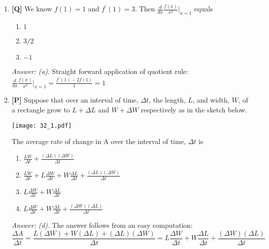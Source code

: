 \documentclass[12pt]{article}
\begin{document}
\begin{enumerate}
\bigskip

\item {\bf [Q]} We know $f(1)=1$ and $f^{\prime}(1)=3$. Then $\frac{d}{dx}\frac{f(x)}{x^2}|_{x=1}$ equals
\begin{enumerate}
\item $1$
\item $3/2$
\item $-1$
\end{enumerate}

{\it Answer: (a).} Straight forward application of quotient rule: $\frac{d}{dx}\frac{f(x)}{x^2} |_{x=1}=\frac{f^{\prime}(1)-2f(1)}{1}=1$

\bigskip

\item {\bf [P]}
Suppose that over an interval of time, $\Delta t$,  the length, $L$,  
and width, $W$,  of a rectangle grow to $L+\Delta L$ and $W+\Delta W$ 
respectively as in the sketch below. 

\begin{center}
%
\texttt{[image: 32\_1.pdf]}
\end{center}

The average rate of change 
in A over the interval of time, $\Delta t$ is

\begin{enumerate}
\item $\displaystyle{\frac{LW}{\Delta t}+\frac{(\Delta L)(\Delta W )}{\Delta t}}$
\item $\displaystyle{\frac{LW}{\Delta t}+L\frac{\Delta W}{\Delta t}+ W\frac{\Delta L}{\Delta t}+ \frac{(\Delta L)(\Delta W)}{\Delta t}}$
\item $\displaystyle{L\frac{ \Delta W}{\Delta t}+W\frac{ \Delta L}{\Delta t}}$
\item $\displaystyle{L\frac{\Delta W}{\Delta t}+W\frac{\Delta L}{\Delta t}+\frac{(\Delta W)(\Delta L)}{\Delta t}}$
\end{enumerate}

{\it Answer: (d).} The answer follows from an easy computation:
$$\displaystyle{\frac{\Delta A}{\Delta t}=\frac{L(\Delta W)+W(\Delta L)+(\Delta L)(\Delta W )}{\Delta t}=L\frac{\Delta W}{\Delta t}+W\frac{\Delta L}{\Delta t}+\frac{(\Delta W)(\Delta L)}{\Delta t}}$$

\bigskip


\end{enumerate}
\end{document}
